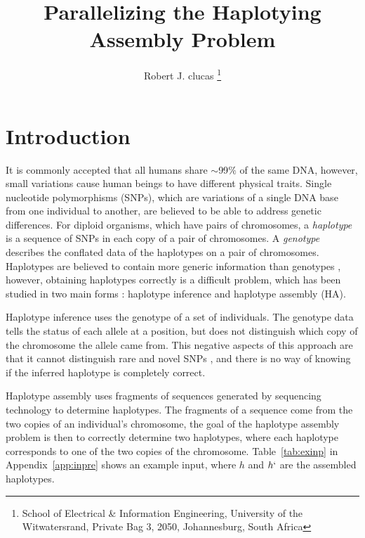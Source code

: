 \documentclass[10pt,a4paer,twocolumn]{article}
\begin{document}
\title{ Parallelizing the  Haplotying Assembly Problem }

\author{Robert J. clucas
\thanks{School of Electrical \& Information Engineering, University of the
Witwatersrand, Private Bag 3, 2050, Johannesburg, South Africa}
}


\abstract{}


\maketitle
\thispagestyle{empty}\pagestyle{empty}



\pagestyle{plain}

\section{Introduction}

It is commonly accepted that all humans share $\mathtt{\sim}$99$\%$ of the same DNA, however, small variations 
cause human beings to have different physical traits. Single nucleotide polymorphisms (SNPs), which are
variations of a single DNA base from one individual to another, are believed to be able to address
genetic differences. For diploid organisms, which have pairs of chromosomes, a \textit{haplotype} is a 
sequence of SNPs in each copy of a pair of chromosomes. A \textit{genotype} describes the conflated data of the
haplotypes on a pair of chromosomes. Haplotypes are believed to contain more generic information than
genotypes \cite{stephens:2001}, however, obtaining haplotypes correctly is a difficult problem, which has been
studied in two main forms : haplotype inference and haplotype assembly (HA). 

Haplotype inference uses the genotype of a set of individuals. The genotype data tells the status of each
allele at a position, but does not distinguish which copy of the chromosome the allele came from.
This negative aspects of this approach are that it cannot distinguish rare and novel SNPs \cite{he:2010}, 
and there is no way of knowing if the inferred haplotype is completely correct. 

Haplotype assembly uses fragments of sequences generated by sequencing technology to determine
haplotypes. The fragments of a sequence come from the two copies of an individual's chromosome, the goal of the
haplotype assembly problem is then to correctly determine two haplotypes, where each haplotype corresponds to
one of the two copies of the chromosome. Table~\ref{tab:exinp} in Appendix~\ref{app:inpre} shows an example
input, where $h$ and $h`$ are the assembled haplotypes. 
\end{document}
